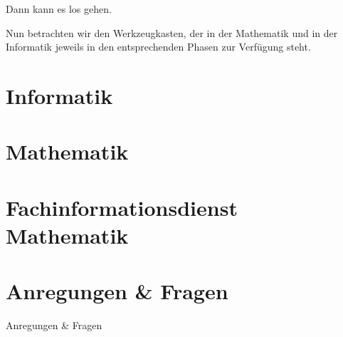 \documentclass[absolute, overlay]{TIBbeamer}
\begin{document}
\begin{frame}{Dann kann es los gehen.}

Nun betrachten wir den Werkzeugkasten, der in der Mathematik und in der Informatik jeweils in den entsprechenden Phasen zur Verf\"ugung steht.

\end{frame}


\section{Informatik}


\section{Mathematik}


\section{Fachinformationsdienst Mathematik}


\section{Anregungen \& Fragen}


\begin{frame}{Anregungen \& Fragen}

\end{frame}

\end{document}
